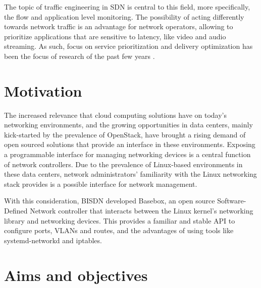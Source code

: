 \par The topic of traffic engineering in SDN is central to this field, more specifically, the flow and application level monitoring.  The possibility of acting
differently towards network traffic is an advantage for network operators, allowing to prioritize applications that are
sensitive to latency, like video and audio streaming. As such, focus on service prioritization and delivery optimization has been the focus of research 
of the past few years \cite{bakhshi_user-centric_2017}.

\section {Motivation}


The increased relevance that cloud computing solutions have on today's networking environments, and the growing opportunities in data centers, mainly
kick-started by the prevalence of OpenStack, have brought a rising demand of open sourced solutions that provide an interface in these environments. Exposing
a programmable interface for managing networking devices is a central function of network controllers. Due to the prevalence of Linux-based environments in these
data centers, network administrators' familiarity with the Linux networking stack provides is a possible interface for network management.

\par With this consideration, BISDN developed Basebox, an open source Software-Defined Network controller that interacts between the Linux kernel's networking
library and networking devices. This provides a familiar and stable API to configure ports, VLANs and routes, and the advantages of using tools like 
systemd-networkd and iptables.

\section {Aims and objectives}


